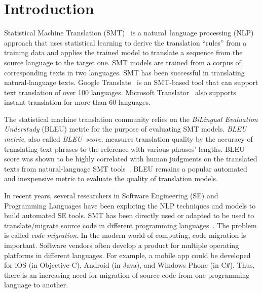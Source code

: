 \section{Introduction}
\label{sec:intro}

Statistical Machine Translation (SMT)~\cite{smtbook} is a
natural~language processing (NLP) approach that uses statistical
learning to derive the translation ``rules'' from a training data and
applies the trained model to translate a sequence from the source
language to the target one.
SMT models are trained from a corpus of corresponding texts in two
languages. SMT has been successful in translating natural-language
texts.  Google Translate~\cite{googletranslate} is an SMT-based
tool that can support text translation of over 100
languages. Microsoft Translator~\cite{mstranslator} also supports
instant translation for more than 60 languages.

The statistical machine translation community relies on the {\em
  BiLingual Evaluation Understudy} (BLEU) metric for the purpose of
evaluating SMT models. {\em BLEU metric}, also called {\em
  BLEU~score}, measures translation quality by the accuracy of
translating text phrases to the reference with various phrases'
lengths. BLEU score was shown to be highly correlated with human judgments
on the translated texts from natural-language SMT
tools~\cite{Papineni2002}.
%
BLEU remains a popular automated and inexpensive
metric to evaluate the quality of translation models.



In recent years, several researchers in Software Engineering (SE) and
Programming Languages have been exploring the NLP techniques and
models to build automated SE tools. SMT has been directly used or
adapted to be used to translate/migrate source code in different
programming
languages~\cite{fse13-nier,icse14-demo,karaivanov14,ase15,icsme16}. The
problem is called {\em code migration}. In the modern world of
computing, code migration is important. Software vendors often develop
a product for multiple operating platforms in different languages. For
example, a mobile app could be developed for iOS (in Objective-C),
Android (in Java), and Windows Phone (in C\texttt{\#}).
Thus, there is an increasing need for migration of source code from
one programming language to another.
%

